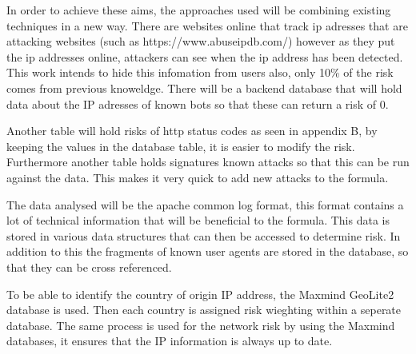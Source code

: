 In order to achieve these aims, the approaches used will be combining existing techniques in a new way. There are websites online that track ip adresses that are attacking websites (such as https://www.abuseipdb.com/) however as they put the ip addresses online, attackers can see when the ip address has been detected. This work intends to hide this infomation from users also, only 10\% of the risk comes from previous knoweldge. There will be a backend database that will hold data about the IP adresses of known bots so that these can return a risk of 0. 

Another table will hold risks of http status codes as  seen in appendix B, by keeping the values in the database table, it is easier to modify the risk. Furthermore another table holds signatures known attacks so that this can be run against the data. This makes it very quick to add new attacks to the formula.

The data analysed will be the apache common log format, this format contains a lot of technical information that will be beneficial to the formula. This data is stored in various data structures that can then be accessed to determine risk. In addition to this the fragments of known user agents are stored in the database, so that they can be cross referenced.  

To be able to identify the country of origin IP address, the Maxmind GeoLite2 database is used. Then each country is assigned risk wieghting within a seperate database. The same process is used for the network risk by using the Maxmind databases, it ensures that the IP information is always up to date.

